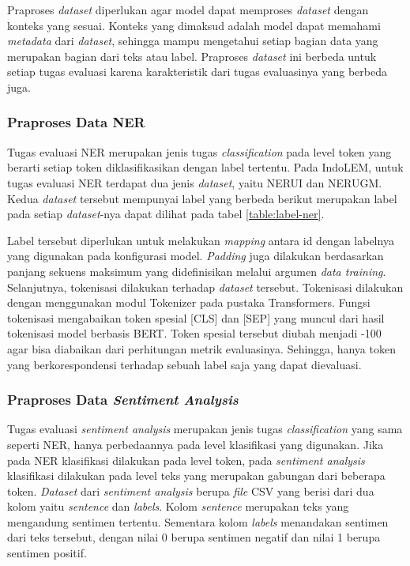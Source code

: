 Praproses \textit{dataset} diperlukan agar model dapat memproses \textit{dataset} dengan konteks yang sesuai. Konteks yang dimaksud adalah model dapat memahami \textit{metadata} dari \textit{dataset}, sehingga mampu mengetahui setiap bagian data yang merupakan bagian dari teks atau label. Praproses \textit{dataset} ini berbeda untuk setiap tugas evaluasi karena karakteristik dari tugas evaluasinya yang berbeda juga.

\subsubsection{Praproses Data NER}

Tugas evaluasi NER merupakan jenis tugas \textit{classification} pada level token yang berarti setiap token  diklasifikasikan dengan label tertentu. Pada IndoLEM, untuk tugas evaluasi NER terdapat dua jenis \textit{dataset}, yaitu NERUI dan NERUGM. Kedua \textit{dataset} tersebut mempunyai label yang berbeda berikut merupakan label pada setiap \textit{dataset}-nya dapat dilihat pada tabel \ref{table:label-ner}.

Label tersebut diperlukan untuk melakukan \textit{mapping} antara id dengan labelnya yang  digunakan pada konfigurasi model. \textit{Padding} juga dilakukan berdasarkan panjang sekuens maksimum yang didefinisikan melalui argumen \textit{data training}. Selanjutnya, tokenisasi  dilakukan terhadap \textit{dataset} tersebut. Tokenisasi dilakukan dengan menggunakan modul Tokenizer pada pustaka Transformers. Fungsi tokenisasi mengabaikan token spesial [CLS] dan [SEP] yang muncul dari hasil tokenisasi model berbasis BERT. Token spesial tersebut diubah menjadi -100 agar bisa diabaikan dari perhitungan metrik evaluasinya. Sehingga, hanya token yang berkorespondensi terhadap sebuah label saja yang dapat dievaluasi.

\subsubsection{Praproses Data \textit{Sentiment Analysis}}

Tugas evaluasi \textit{sentiment analysis} merupakan jenis tugas \textit{classification} yang sama seperti NER, hanya perbedaannya pada level klasifikasi yang digunakan. Jika pada NER klasifikasi dilakukan pada level token, pada \textit{sentiment analysis} klasifikasi dilakukan pada level teks yang merupakan gabungan dari beberapa token. \textit{Dataset} dari \textit{sentiment analysis} berupa \textit{file} CSV yang berisi dari dua kolom yaitu \textit{sentence} dan \textit{labels}. Kolom \textit{sentence} merupakan teks yang mengandung sentimen tertentu. Sementara kolom \textit{labels} menandakan sentimen dari teks tersebut, dengan nilai 0 berupa sentimen negatif dan  nilai 1 berupa sentimen positif.

